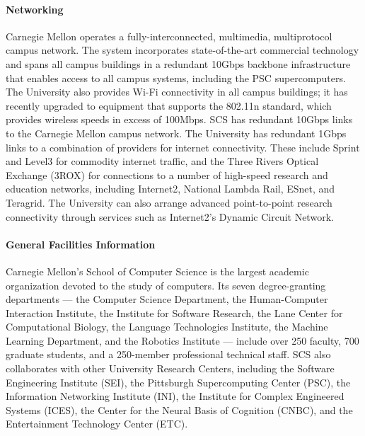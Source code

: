 \documentclass[11pt]{article}
\begin{document}
\paragraph{Networking}
Carnegie Mellon operates a fully-interconnected, multimedia, multiprotocol campus network. The system incorporates
state-of-the-art commercial technology and spans all campus buildings in a redundant 10Gbps backbone infrastructure
that enables access to all campus systems, including the PSC supercomputers. The University also provides Wi-Fi
connectivity in all campus buildings; it has recently upgraded to equipment that supports the 802.11n standard, which
provides wireless speeds in excess of 100Mbps.
SCS has redundant 10Gbps links to the Carnegie Mellon campus network. The University has redundant 1Gbps links to a
combination of providers for internet connectivity. These include Sprint and Level3 for commodity internet traffic, and
the Three Rivers Optical Exchange (3ROX) for connections to a number of high-speed research and education networks,
including Internet2, National Lambda Rail, ESnet, and Teragrid. The University can also arrange advanced point-to-point
research connectivity through services such as Internet2's Dynamic Circuit Network.

\paragraph{General Facilities Information}
Carnegie Mellon's School of Computer Science is the largest academic organization devoted to the study of computers.
Its seven degree-granting departments --- the Computer Science Department, the Human-Computer Interaction Institute,
the Institute for Software Research, the Lane Center for Computational Biology, the Language Technologies Institute,
the Machine Learning Department, and the Robotics Institute --- include over 250 faculty, 700 graduate students, and a
250-member professional technical staff. SCS also collaborates with other University Research Centers, including the
Software Engineering Institute (SEI), the Pittsburgh Supercomputing Center (PSC), the Information Networking Institute
(INI), the Institute for Complex Engineered Systems (ICES), the Center for the Neural Basis of Cognition (CNBC), and the
Entertainment Technology Center (ETC).


\vfill
\end{document}
